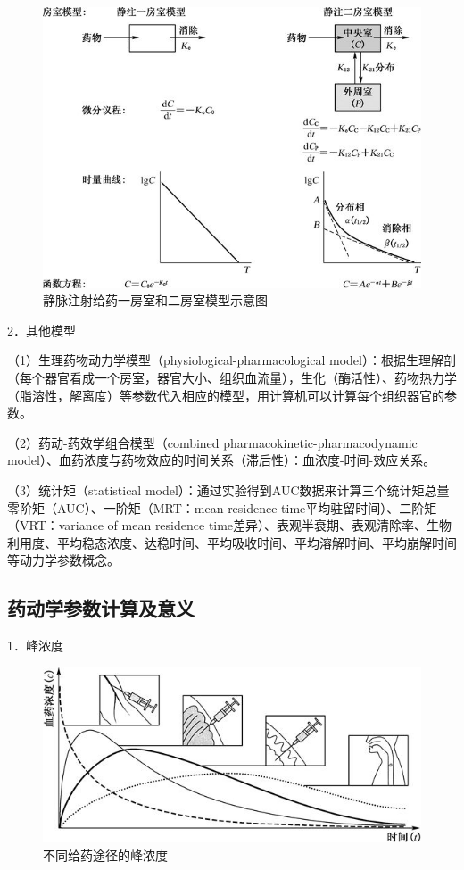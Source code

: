 \begin{figure}[!htbp]
 \centering
 \includegraphics{./images/Image00056.jpg}
 \captionsetup{justification=centering}
 \caption{静脉注射给药一房室和二房室模型示意图}
 \label{fig3-17}
  \end{figure} 

2．其他模型

（1）生理药物动力学模型（physiological-pharmacological
model）：根据生理解剖（每个器官看成一个房室，器官大小、组织血流量），生化（酶活性）、药物热力学（脂溶性，解离度）等参数代入相应的模型，用计算机可以计算每个组织器官的参数。

（2）药动-药效学组合模型（combined pharmacokinetic-pharmacodynamic
model）、血药浓度与药物效应的时间关系（滞后性）：血浓度-时间-效应关系。

（3）统计矩（statistical
model）：通过实验得到AUC数据来计算三个统计矩总量零阶矩（AUC）、一阶矩（MRT：mean
residence time平均驻留时间）、二阶矩（VRT：variance of mean residence
time差异）、表观半衰期、表观清除率、生物利用度、平均稳态浓度、达稳时间、平均吸收时间、平均溶解时间、平均崩解时间等动力学参数概念。

\subsection{药动学参数计算及意义}

1．峰浓度

\begin{figure}[!htbp]
 \centering
 \includegraphics{./images/Image00057.jpg}
 \captionsetup{justification=centering}
 \caption{不同给药途径的峰浓度}
 \label{fig3-18}
  \end{figure} 

